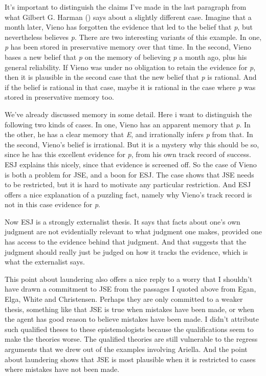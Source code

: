 \documentclass[
  10pt,
  letterpaper,
  twoside]{scrbook}
\begin{document}
It's important to distinguish the claims I've made in the last paragraph
from what Gilbert G. Harman () says about
a slightly different case. Imagine that a month later, {Vieno} has
forgotten the evidence that led to the belief that \emph{p}, but
nevertheless believes \emph{p}. There are two interesting variants of
this example. In one, \emph{p} has been stored in preservative memory
over that time. In the second, {Vieno} bases a new belief that \emph{p}
on the memory of believing \emph{p} a month ago, plus his general
reliability. If {Vieno} was under no obligation to retain the evidence
for \emph{p}, then it is plausible in the second case that the new
belief that \emph{p} is rational. And if the belief is rational in that
case, maybe it is rational in the case where \emph{p} was stored in
preservative memory too.

We've already discussed memory in some detail. Here i want to
distinguish the following two kinds of cases. In one, {Vieno} has an
apparent memory that \emph{p}. In the other, he has a clear memory that
\emph{E}, and irrationally infers \emph{p} from that. In the second,
{Vieno}'s belief is irrational. But it is a mystery why this should be
so, since he has this excellent evidence for \emph{p}, from his own
track record of success. ESJ explains this nicely, since that evidence
is screened off. So the case of {Vieno} is both a problem for JSE, and a
boon for ESJ. The case shows that JSE needs to be restricted, but it is
hard to motivate any particular restriction. And ESJ offers a nice
explanation of a puzzling fact, namely why {Vieno}'s track record is not
in this case evidence for \emph{p}.

Now ESJ is a strongly externalist thesis. It says that facts about one's
own judgment are not evidentially relevant to what judgment one makes,
provided one has access to the evidence behind that judgment. And that
suggests that the judgment should really just be judged on how it tracks
the evidence, which is what the externalist says.

This point about laundering also offers a nice reply to a worry that I
shouldn't have drawn a commitment to JSE from the passages I quoted
above from Egan, Elga, White and Christensen. Perhaps they are only
committed to a weaker thesis, something like that JSE is true when
mistakes have been made, or when the agent has good reason to believe
mistakes have been made. I didn't attribute such qualified theses to
these epistemologists because the qualifications seem to make the
theories worse. The qualified theories are still vulnerable to the
regress arguments that we drew out of the examples involving {Ariella}.
And the point about laundering shows that JSE is most plausible when it
is restricted to cases where mistakes have not been made.
\end{document}
